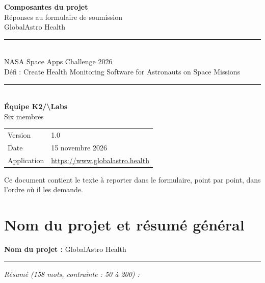 \documentclass[11pt,a4paper]{article}
\let\sectionorig\section
\renewcommand{\section}{\Needspace{5\baselineskip}\sectionorig}
\newcommand{\kl}{K2/\textbackslash{}Labs}
\begin{document}
\begin{titlepage}
\thispagestyle{empty}
\centering
\vspace*{2.4cm}

{\Huge\bfseries Composantes du projet}\\[0.45cm]
{\Large R\'eponses au formulaire de soumission}\\[0.3cm]
{\large GlobalAstro Health}\\[1.6cm]

\rule{0.72\textwidth}{0.6pt}\\[0.45cm]
{\large NASA Space Apps Challenge 2026}\\[0.15cm]
{\normalsize D\'efi : Create Health Monitoring Software for Astronauts on Space Missions}\\[0.45cm]
\rule{0.72\textwidth}{0.6pt}\\[1.6cm]

{\large\bfseries \'Equipe \kl}\\[0.25cm]
{\normalsize Six membres}\\[2.0cm]

\begin{tabular}{@{}ll@{}}
\small Version & \small 1.0 \\[2pt]
\small Date & \small 15 novembre 2026 \\[2pt]
\small Application & \small \url{https://www.globalastro.health} \\
\end{tabular}

\vfill
{\footnotesize Ce document contient le texte \`a reporter dans le formulaire, point par point, dans l'ordre o\`u il les demande.}
\end{titlepage}

\tableofcontents
\newpage

\section{Nom du projet et r\'esum\'e g\'en\'eral}

\textbf{Nom du projet :} GlobalAstro Health

\vspace{0.25cm}
\noindent\rule{\textwidth}{0.4pt}
\vspace{0.15cm}

\noindent\emph{R\'esum\'e (158 mots, contrainte : 50 \`a 200) :}
\end{document}
